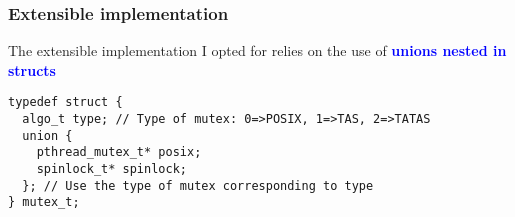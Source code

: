 \documentclass{beamer}
\newcommand{\textblue}[1]{\textbf{\textcolor{blue}{#1}}}
\begin{document}
\begin{frame}[containsverbatim]
\frametitle{Extensible implementation}

  The extensible implementation I opted for relies on the use of \textblue{unions nested in structs}

  \bigskip

  \begin{lstlisting}[style=CStyle]
typedef struct {
  algo_t type; // Type of mutex: 0=>POSIX, 1=>TAS, 2=>TATAS
  union {
    pthread_mutex_t* posix;
    spinlock_t* spinlock;
  }; // Use the type of mutex corresponding to type
} mutex_t;
  \end{lstlisting}

\end{frame}
\end{document}
